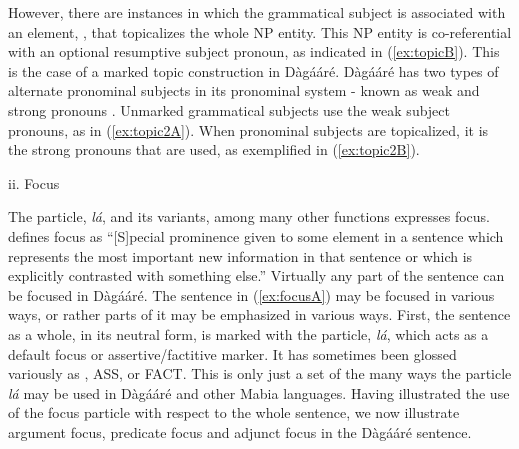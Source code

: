 However, there are instances in which the grammatical subject is associated with an element,
\textsc{{\TOP}}, that topicalizes the whole NP entity. This NP entity is co-referential with an optional
resumptive subject pronoun, as indicated in (\ref{ex:topicB}). This is the case of a marked topic
construction in Dàgááré. Dàgááré has two types of alternate pronominal subjects in its
pronominal system - known as weak and strong pronouns \citet{Bodomo1997}. Unmarked
grammatical subjects use the weak subject pronouns, as in (\ref{ex:topic2A}). When pronominal subjects
are topicalized, it is the strong pronouns that are used, as exemplified in (\ref{ex:topic2B}).\bigskip

\noindent ii. Focus

The particle, \textit{lá}, and its variants, among many other functions expresses focus. \citet[105]{Trask1993} defines focus as ``[S]pecial prominence given to some element in a sentence
which represents the most important new information in that sentence or which is explicitly
contrasted with something else.'' Virtually any part of the sentence can be focused in
Dàgááré. The sentence in (\ref{ex:focusA}) may be focused in various ways, or rather parts of it may be
emphasized in various ways. First, the sentence as a whole, in its neutral form, is marked with
the particle, \textit{lá}, which acts as a default focus or assertive/factitive marker. It has sometimes
been glossed variously as \textsc{{\FOC}}, \textsc{ASS}, or \textsc{FACT}. This is only just a set of the many ways the
particle \textit{lá} may be used in Dàgááré
\citep{Bodomo1997, Bodomo1997Pathfinders,  Dakubu1998} and
other Mabia languages. Having illustrated the use of the focus particle with respect to the
whole sentence, we now illustrate argument focus, predicate focus and adjunct focus in the
Dàgááré sentence.



\ea {}
\z\z 

